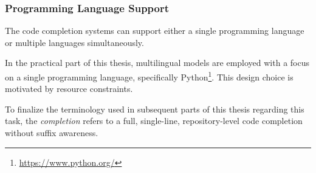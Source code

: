 \subsubsection*{Programming Language Support}

The code completion systems can support either a single programming language or multiple languages simultaneously.

In the practical part of this thesis, multilingual models are employed with a focus on a single programming language, specifically Python\footnote{\url{https://www.python.org/}}. This design choice is motivated by resource constraints.
\medskip

To finalize the terminology used in subsequent parts of this thesis regarding this task, the \textit{completion} refers to a full, single-line, repository-level code completion without suffix awareness.
